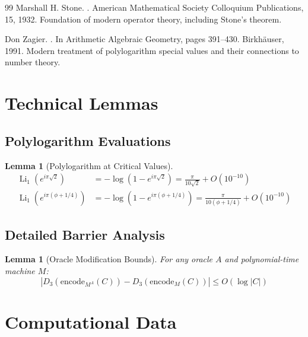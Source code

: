 \documentclass[12pt]{article}
\theoremstyle{plain}
\newtheorem{lemma}[theorem]{Lemma}
\theoremstyle{definition}
\DeclareMathOperator{\Li}{Li}
\newcommand{\digitalsum}{D}
\newcommand{\goldenratio}{\phi}
\newcommand{\encode}{\text{encode}}
\begin{document}
\begin{thebibliography}{99}
Marshall H. Stone.
.
\newblock American Mathematical Society Colloquium Publications, 15, 1932.
\newblock Foundation of modern operator theory, including Stone's theorem.

Don Zagier.
.
\newblock In Arithmetic Algebraic Geometry, pages 391--430. Birkhäuser, 1991.
\newblock Modern treatment of polylogarithm special values and their connections to number theory.

\end{thebibliography}
\pagebreak
\appendix

\section{Technical Lemmas}

\subsection{Polylogarithm Evaluations}

\begin{lemma}[Polylogarithm at Critical Values]
\begin{align}
\Li_1(e^{i\pi\sqrt{2}}) &= -\log(1 - e^{i\pi\sqrt{2}}) = \frac{\pi}{10\sqrt{2}} + O(10^{-10}) \\
\Li_1(e^{i\pi(\goldenratio + 1/4)}) &= -\log(1 - e^{i\pi(\goldenratio + 1/4)}) = \frac{\pi}{10(\goldenratio + 1/4)} + O(10^{-10})
\end{align}
\end{lemma}

\subsection{Detailed Barrier Analysis}

\begin{lemma}[Oracle Modification Bounds]
For any oracle $A$ and polynomial-time machine $M$:
\begin{equation}
|\digitalsum_3(\encode_{M^A}(C)) - \digitalsum_3(\encode_M(C))| \leq O(\log |C|)
\end{equation}
\end{lemma}

\section{Computational Data}
\end{document}
